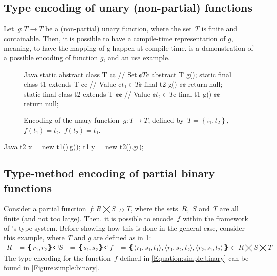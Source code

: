\subsection{Type encoding of unary (non-partial) functions}
Let~$g: T \rightarrow T $ be a (non-partial) unary function,
  where the set~$T$ is finite and containable.
Then, it is possible to have a compile-time representation of $g$,
  meaning, to have the mapping of g happen at compile-time.  
 is a demonstration of a possible encoding
of function $g$, and an use example.  

\begin{figure}
  \begin{Code}{Java}
static abstract class T {¢¢ // Set ¢$T$¢
  abstract T g();
  static final class t1 extends T {¢¢ // Value ¢$t₁∈T$¢
    final t2 g() {¢¢ return null; }
  }
  static final class t2 extends T {¢¢ // Value ¢$t₂∈T$¢
    final t1 g() {¢¢ return null; }
  }
}
\end{Code}
  \caption{Encoding of the unary function~$g: T→T$,
  defined by~$T=\left\{ t_1,t_2 \right\}$,~$f(t₁)=t₂$,~$f(t₂)=t₁$.}
  \label{Figure:unary:function}
\end{figure}

\begin{code}{Java}
  t2 x = new t1().g();
  t1 y = new t2().g();
\end{code}

\subsection{Type-method encoding of partial binary functions}
Consider a partial function~$f: R⨉S↛T$,
  where the sets~$R$,~$S$ and~$T$ are all finite (and not too large).
Then, it is possible to encode~$f$ within the framework of \Java's type system.
Before showing how this is done in the general case, consider this example, 
where~$T$ and $g$ are defined as in \cref{Figure:unary:function}:
\begin{equation}
  \label{Equation:simple:binary}
\begin{split}
  R & = ❴ r₁, r₂❵⏎
  S & = ❴ s₁, s₂❵⏎
  f & = ❴ ⟨r₁, s₁, t₁⟩, ⟨r₁, s₂, t₂⟩, ⟨r₂, s₁, t₂⟩ ❵ ⊂R⨉S⨉T
\end{split}
\end{equation}
The \Java type encoding for the function~$f$ defined in \cref{Equation:simple:binary}
  can be found in \cref{Figure:simple:binary}.

